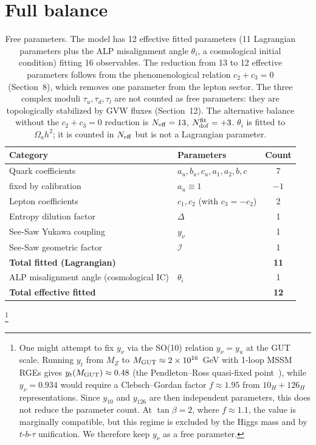 \documentclass[12pt,a4paper]{article}
\numberwithin{equation}{section}
\begin{document}
\section{Full balance}
\begin{table}[H]
\centering
\caption{Free parameters. The model has 12 effective fitted parameters (11 Lagrangian parameters plus the ALP misalignment angle \(\theta_i\), a cosmological initial condition) fitting 16 observables. The reduction from 13 to 12 effective parameters follows from the phenomenological relation \(c_2 + c_3 = 0\) (Section~8), which removes one parameter from the lepton sector. The three complex moduli \(\tau_u, \tau_d, \tau_l\) are not counted as free parameters: they are topologically stabilized by GVW fluxes (Section~12). The alternative balance without the \(c_2+c_3=0\) reduction is \(N_{\rm eff} = 13\), \(N_{\rm dof}^{\rm fit} = +3\). \(\theta_i\) is fitted to \(\Omega_a h^2\); it is counted in \(N_{\rm eff}\) but is not a Lagrangian parameter.}
\begin{tabular}{llc}
\toprule
Category & Parameters & Count \\
\midrule
Quark coefficients & \(a_u, b_u, c_u, a_1, a_2, b, c\) & 7 \\
\quad fixed by calibration & \(a_u \equiv 1\) & \(-1\) \\
Lepton coefficients & \(c_1, c_2\) (with \(c_3 = -c_2\)) & 2 \\
Entropy dilution factor & \(\Delta\) & 1 \\
See-Saw Yukawa coupling & \(y_\nu\) & 1 \\
See-Saw geometric factor & \(\mathcal{I}\) & 1 \\
\midrule
\textbf{Total fitted (Lagrangian)} & & \textbf{11} \\
\midrule
ALP misalignment angle (cosmological IC) & \(\theta_i\) & 1 \\
\midrule
\textbf{Total effective fitted} & & \textbf{12} \\
\bottomrule
\end{tabular}
\end{table}

\vspace{0.3cm}
\noindent\footnote{One might attempt to fix \(y_\nu\) via the SO(10) relation \(y_\nu = y_u\) at the GUT scale. Running \(y_t\) from \(M_Z\) to \(M_{\rm GUT} \approx 2\times 10^{16}\)~GeV with 1-loop MSSM RGEs gives \(y_t(M_{\rm GUT}) \approx 0.48\) (the Pendleton--Ross quasi-fixed point~\cite{PendletonRoss1981}), while \(y_\nu = 0.934\) would require a Clebsch--Gordan factor \(f \approx 1.95\) from \(10_H + 126_H\) representations. Since \(y_{10}\) and \(y_{126}\) are then independent parameters, this does not reduce the parameter count. At \(\tan\beta = 2\), where \(f \approx 1.1\), the value is marginally compatible, but this regime is excluded by the Higgs mass and by \(t\)-\(b\)-\(\tau\) unification. We therefore keep \(y_\nu\) as a free parameter.}
\end{document}
